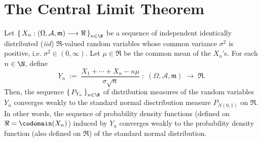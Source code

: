 \documentclass{article}
\begin{document}


\pagestyle{fancy}

%

\lfoot[]{}
\cfoot[]{}
\rfoot[]{\thepage}


\section{The Central Limit Theorem}
\setcounter{theorem}{0}

\begin{theorem}\label{CentralLimitTheorem} \mbox{} \vskip 0.1cm \noindent
Let $\left\{\,X_{n}:(\Omega,\mathcal{A},\mathfrak{m})\longrightarrow\Re\,\right\}_{n\in\N}$ be a sequence of independent identically distributed (\emph{iid}) $\Re$-valued random variables whose common variance $\sigma^{2}$ is positive, i.e. $\sigma^{2} \in (0,\infty)$.  Let $\mu\in\Re$ be the common mean of the $X_{n}$'s.  For each $n \in \N$, define
\begin{equation*}
Y_{n} \; := \; \dfrac{X_{1}+\cdots+X_{n}-n\mu}{\sigma\sqrt{n}} \; : \; \left(\Omega,\mathcal{A},\mathfrak{m}\right) \; \longrightarrow \; \Re.
\end{equation*}
Then, the sequence $\left\{\,P_{Y_{n}}\,\right\}_{n\in\N}$ of distribution measures of the random variables $Y_{n}$ converges weakly to the standard normal disctribution measure $P_{N(0,1)}$ on $\Re$.  In other words, the sequence of probability density functions (defined on $\Re=\codomain(X_{n})$) induced by $Y_{n}$ converges weakly to the probability density function (also defined on $\Re$) of the standard normal distribution.
\end{theorem}
\end{document}
